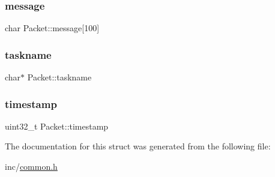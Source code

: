 \mbox{\label{struct_packet_a3a243b3013e1a3da4c5a88ec666f6b17}} 
\subsubsection{\texorpdfstring{message}{message}}
{\footnotesize\ttfamily char Packet\+::message\mbox{[}100\mbox{]}}

\mbox{\label{struct_packet_ad7176ab16a5711801c7d89a56c5bb216}} 
\subsubsection{\texorpdfstring{taskname}{taskname}}
{\footnotesize\ttfamily char$\ast$ Packet\+::taskname}

\mbox{\label{struct_packet_af4cbc14232456ae442fd92dfda772586}} 
\subsubsection{\texorpdfstring{timestamp}{timestamp}}
{\footnotesize\ttfamily uint32\+\_\+t Packet\+::timestamp}



The documentation for this struct was generated from the following file\+:\begin{DoxyCompactItemize}
\item 
inc/\mbox{\hyperlink{common_8h}{common.\+h}}\end{DoxyCompactItemize}

